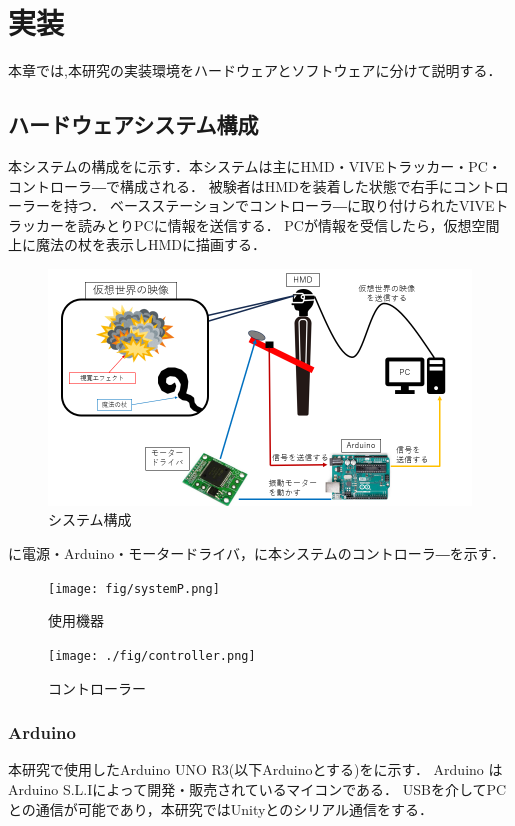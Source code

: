 \chapter{実装}
本章では,本研究の実装環境をハードウェアとソフトウェアに分けて説明する．

\section{ハードウェアシステム構成}
本システムの構成をに示す．本システムは主にHMD・VIVEトラッカー・PC・コントローラ―で構成される．
被験者はHMDを装着した状態で右手にコントローラーを持つ．
ベースステーションでコントローラ―に取り付けられたVIVEトラッカーを読みとりPCに情報を送信する．
PCが情報を受信したら，仮想空間上に魔法の杖を表示しHMDに描画する．

\begin{figure}[h]
\centering
\includegraphics[clip,width=14cm]{fig/systemhard.png}
\caption{システム構成}\label{sys}
\end{figure}

\newpage

に電源・Arduino・モータードライバ，に本システムのコントローラ―を示す．

\begin{figure}[h]
    \centering
    \texttt{[image: fig/systemP.png]}
    \caption{使用機器}\label{sysP}
    \end{figure}

\begin{figure}[h]
\centering
\texttt{[image: ./fig/controller.png]}
\caption{コントローラー}\label{controller}
\end{figure}

\newpage

\subsection{Arduino}
本研究で使用したArduino UNO R3\cite{arduino}(以下Arduinoとする)をに示す．
Arduino はArduino S.L.Iによって開発・販売されているマイコンである．
USBを介してPCとの通信が可能であり，本研究ではUnityとのシリアル通信をする．

